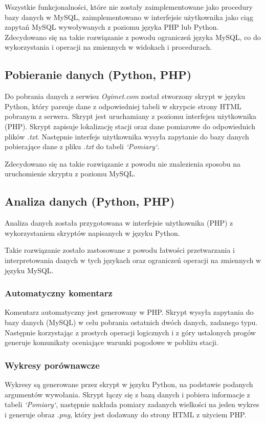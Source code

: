 \documentclass[12pt,a4paper]{article}
\begin{document}
\par Wszystkie funkcjonalności, które nie zostały zaimplementowane jako procedury bazy danych w MySQL, zaimplementowano w interfejsie użytkownika jako ciąg zapytań MySQL wywoływanych z poziomu języka PHP lub Python. Zdecydowano się na takie rozwiązanie z powodu ograniczeń języka MySQL, co do wykorzystania i operacji na zmiennych w widokach i procedurach.

\subsection{Pobieranie danych (Python, PHP)}
Do pobrania danych z serwisu \textit{Ogimet.com} został stworzony skrypt w języku Python, który parsuje dane z odpowiedniej tabeli w skrypcie strony HTML pobranym z serwera. Skrypt jest uruchamiany z poziomu interfejsu użytkownika (PHP). Skrypt zapisuje lokalizację stacji oraz dane pomiarowe do odpowiednich plików \textit{.txt}. Następnie interfejs użytkownika wysyła zapytanie do bazy danych pobierające dane z pliku \textit{.txt} do tabeli \textit{`Pomiary`}.\par
Zdecydowano się na takie rozwiązanie z powodu nie znalezienia sposobu na uruchomienie skryptu z poziomu MySQL.
\subsection{Analiza danych (Python, PHP)}
Analiza danych została przygotowana w interfejsie użytkownika (PHP) z wykorzystaniem skryptów napisanych w języku Python.\par
Takie rozwiązanie zostało zastosowane z powodu łatwości przetwarzania i interpretowania danych w tych językach oraz ograniczeń operacji na zmiennych w języku MySQL.
\subsubsection{Automatyczny komentarz}
Komentarz automatyczny jest generowany w PHP. Skrypt wysyła zapytania do bazy danych (MySQL) w celu pobrania ostatnich dwóch danych, zadanego typu. Następnie korzystając z prostych operacji logicznych i z góry ustalonych progów generuje komunikaty oceniające warunki pogodowe w pobliżu stacji.
\subsubsection{Wykresy porównawcze}
Wykresy są generowane przez skrypt w języku Python, na podstawie podanych argumentów wywołania. Skrypt łączy się z bazą danych i pobiera informacje z tabeli \textit{`Pomiary`}, następnie nakłada pomiary zadanych wielkości na jeden wykres i generuje obraz \textit{.png}, który jest dodawany do strony HTML z użyciem PHP.
\end{document}
